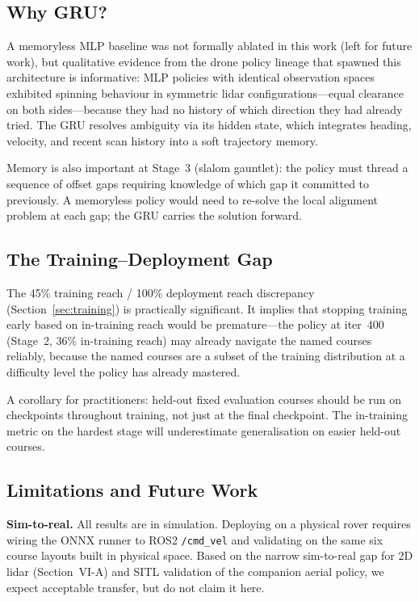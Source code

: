 \documentclass[letterpaper, 10pt, journal]{IEEEtran}
\begin{document}
\subsection{Why GRU?}

A memoryless MLP baseline was not formally ablated in this work (left for future
work), but qualitative evidence from the drone policy lineage that spawned this
architecture is informative: MLP policies with identical observation spaces exhibited
spinning behaviour in symmetric lidar configurations---equal clearance on both
sides---because they had no history of which direction they had already tried.
The GRU resolves ambiguity via its hidden state, which integrates heading, velocity,
and recent scan history into a soft trajectory memory.

Memory is also important at Stage~3 (slalom gauntlet): the policy must thread a
sequence of offset gaps requiring knowledge of which gap it committed to previously.
A memoryless policy would need to re-solve the local alignment problem at each gap;
the GRU carries the solution forward.

\subsection{The Training--Deployment Gap}

The 45\% training reach / 100\% deployment reach discrepancy (Section~\ref{sec:training})
is practically significant. It implies that stopping training early based on in-training
reach would be premature---the policy at iter~400 (Stage~2, 36\% in-training reach)
may already navigate the named courses reliably, because the named courses are a subset
of the training distribution at a difficulty level the policy has already mastered.

A corollary for practitioners: held-out fixed evaluation courses should be run on
checkpoints throughout training, not just at the final checkpoint. The in-training
metric on the hardest stage will underestimate generalisation on easier held-out
courses.

\subsection{Limitations and Future Work}

\textbf{Sim-to-real.} All results are in simulation. Deploying on a physical rover
requires wiring the ONNX runner to ROS2 \texttt{/cmd\_vel} and validating on the
same six course layouts built in physical space. Based on the narrow sim-to-real gap
for 2D lidar (Section~VI-A) and SITL validation of the companion aerial policy, we
expect acceptable transfer, but do not claim it here.
\end{document}
